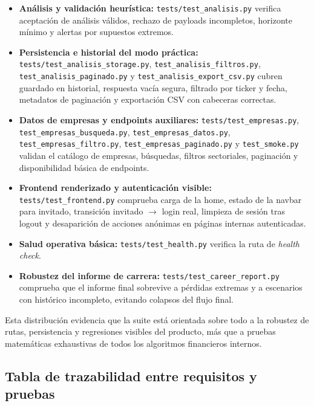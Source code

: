 \begin{itemize}
    \item \textbf{Análisis y validación heurística:}
    \texttt{tests/test\_analisis.py} verifica aceptación de análisis válidos, rechazo de payloads incompletos, horizonte mínimo y alertas por supuestos extremos.

    \item \textbf{Persistencia e historial del modo práctica:}
    \texttt{tests/test\_analisis\_storage.py}, \texttt{test\_analisis\_filtros.py}, \texttt{test\_analisis\_paginado.py} y \texttt{test\_analisis\_export\_csv.py} cubren guardado en historial, respuesta vacía segura, filtrado por ticker y fecha, metadatos de paginación y exportación CSV con cabeceras correctas.

    \item \textbf{Datos de empresas y endpoints auxiliares:}
    \texttt{tests/test\_empresas.py}, \texttt{test\_empresas\_busqueda.py}, \texttt{test\_empresas\_datos.py}, \texttt{test\_empresas\_filtro.py}, \texttt{test\_empresas\_paginado.py} y \texttt{test\_smoke.py} validan el catálogo de empresas, búsquedas, filtros sectoriales, paginación y disponibilidad básica de endpoints.

    \item \textbf{Frontend renderizado y autenticación visible:}
    \texttt{tests/test\_frontend.py} comprueba carga de la home, estado de la navbar para invitado, transición invitado $\rightarrow$ login real, limpieza de sesión tras logout y desaparición de acciones anónimas en páginas internas autenticadas.

    \item \textbf{Salud operativa básica:}
    \texttt{tests/test\_health.py} verifica la ruta de \textit{health check}.

    \item \textbf{Robustez del informe de carrera:}
    \texttt{tests/test\_career\_report.py} comprueba que el informe final sobrevive a pérdidas extremas y a escenarios con histórico incompleto, evitando colapsos del flujo final.
\end{itemize}

Esta distribución evidencia que la suite está orientada sobre todo a la robustez de rutas, persistencia y regresiones visibles del producto, más que a pruebas matemáticas exhaustivas de todos los algoritmos financieros internos.

\subsection{Tabla de trazabilidad entre requisitos y pruebas}


